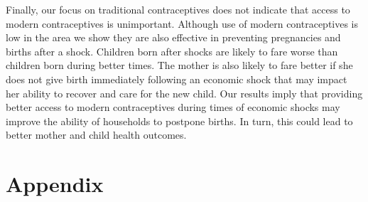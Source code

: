 \documentclass[letterpaper,12pt]{article}
\begin{document}
Finally, our focus on traditional contraceptives does
not indicate that access to modern contraceptives is unimportant.
Although use of modern contraceptives is low in the area we show
they are also effective in preventing pregnancies and births after a shock.
Children born after shocks are likely to fare worse than children born 
during better times.
The mother is also likely to fare better if she does not give birth 
immediately following an economic shock that may impact her ability 
to recover and care for the new child.
Our results imply that providing better access to modern contraceptives 
during times of economic shocks may improve the ability of households 
to postpone births.
In turn, this could lead to better mother and child health outcomes.



% 





\clearpage


\appendix

\renewcommand\thetable{A-\arabic{table}}
\renewcommand\thefigure{A-\arabic{figure}}
\setcounter{table}{0}
\setcounter{figure}{0}

\section{Appendix}







    










\end{document}
